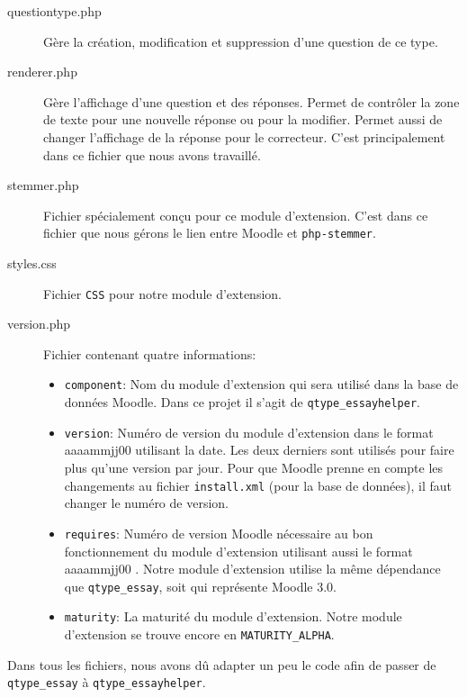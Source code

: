 \begin{description}
 \item[questiontype.php]
 
 G\`ere la cr\'eation, modification et suppression d'une question de ce type.
 
 \item[renderer.php]
 
 G\`ere l'affichage d'une question et des r\'eponses.
 Permet de contr\^oler la zone de texte pour une nouvelle r\'eponse ou pour la modifier.
 Permet aussi de changer l'affichage de la r\'eponse pour le correcteur.
 C'est principalement dans ce fichier que nous avons travaill\'e.
 
 \item[stemmer.php]
 
 Fichier sp\'ecialement con\c{c}u pour ce module d'extension.
 C'est dans ce fichier que nous g\'erons le lien entre Moodle et \texttt{php-stemmer}.
 
 \item[styles.css]
 
 Fichier \texttt{CSS} pour notre module d'extension.
 
 \item[version.php]
 
 Fichier contenant quatre informations:
 \begin{itemize}
   \item \texttt{component}: 
   Nom du module d'extension qui sera utilis\'e dans la base de donn\'ees Moodle.
   Dans ce projet il s'agit de \texttt{qtype\_essayhelper}.
   
   \item \texttt{version}:
   Num\'ero de version du module d'extension dans le format \og aaaammjj00 \fg{} utilisant la date.
   Les deux derniers  \fg{} sont utilis\'es pour faire plus qu'une version par jour.
   Pour que Moodle prenne en compte les changements au fichier \texttt{install.xml} (pour la base de donn\'ees), il faut changer le num\'ero de version.
   
   \item \texttt{requires}:
   Num\'ero de version Moodle n\'ecessaire au bon fonctionnement du module d'extension utilisant aussi le format \og aaaammjj00 \fg{}.
   Notre module d'extension utilise la m\^eme d\'ependance que \texttt{qtype\_essay}, soit  \fg{} qui repr\'esente Moodle 3.0.
   
   \item \texttt{maturity}:
   La maturit\'e du module d'extension.
   Notre module d'extension se trouve encore en \texttt{MATURITY\_ALPHA}.
 \end{itemize}
\end{description}
Dans tous les fichiers, nous avons d\^u adapter un peu le code afin de passer de \texttt{qtype\_essay} \`a \texttt{qtype\_essayhelper}.

